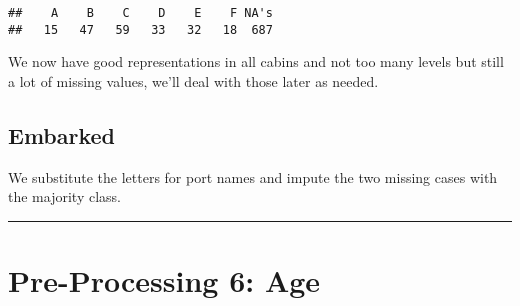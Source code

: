 \documentclass[]{article}
\newenvironment{Shaded}{\begin{snugshade}}{\end{snugshade}}
\newcommand{\KeywordTok}[1]{\textcolor[rgb]{0.13,0.29,0.53}{\textbf{#1}}}
\newcommand{\StringTok}[1]{\textcolor[rgb]{0.31,0.60,0.02}{#1}}
\newcommand{\CommentTok}[1]{\textcolor[rgb]{0.56,0.35,0.01}{\textit{#1}}}
\newcommand{\OperatorTok}[1]{\textcolor[rgb]{0.81,0.36,0.00}{\textbf{#1}}}
\newcommand{\NormalTok}[1]{#1}
\begin{document}
\begin{Shaded}
\end{Shaded}

\begin{verbatim}
##    A    B    C    D    E    F NA's 
##   15   47   59   33   32   18  687
\end{verbatim}

We now have good representations in all cabins and not too many levels
but still a lot of missing values, we'll deal with those later as
needed.

\subsection{Embarked}\label{embarked}

We substitute the letters for port names and impute the two missing
cases with the majority class.

\begin{Shaded}
\end{Shaded}

\begin{center}\rule{0.5\linewidth}{\linethickness}\end{center}

\hypertarget{preprocess6-link}{\section{Pre-Processing 6:
Age}\label{preprocess6-link}}
\end{document}
